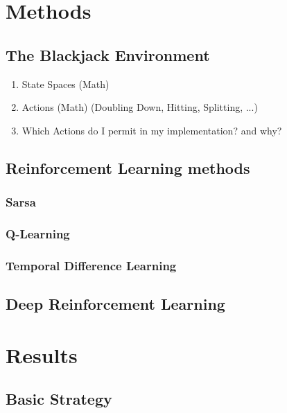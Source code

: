 \documentclass[conference]{IEEEtran}
\begin{document}
\section{Methods}

\subsection{The Blackjack Environment}
\begin{enumerate}
	\item State Spaces (Math)
	\item Actions (Math) (Doubling Down, Hitting, Splitting, ...)
	\item Which Actions do I permit in my implementation? and why?
\end{enumerate}

\subsection{Reinforcement Learning methods}
\subsubsection{Sarsa}
\subsubsection{Q-Learning}
\subsubsection{Temporal Difference Learning}


\subsection{Deep Reinforcement Learning}




\section{Results}

\subsection{Basic Strategy}
\end{document}
